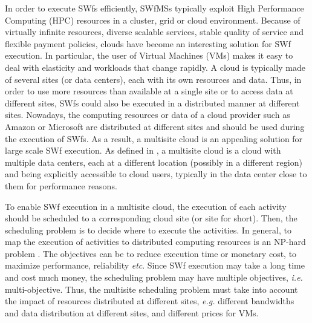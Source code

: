 In order to execute SWfs efficiently, SWfMSs typically exploit High Performance Computing (HPC) resources in a cluster, grid or cloud environment. 
Because of virtually infinite resources, diverse scalable services, stable quality of service and flexible payment policies, clouds have become an interesting solution for SWf execution. In particular, the user of Virtual Machines (VMs) makes it easy to deal with elasticity and workloads that change rapidly.
A cloud is typically made of several sites (or data centers), each
with its own resources and data. Thus, in order to use more resources than
available at a single site or to access data at different sites, SWfs could also be executed in a distributed manner at different sites.
Nowadays, the computing resources or data of a cloud provider such as Amazon or Microsoft are distributed at different sites and should be used during the execution of SWfs. 
As a result, a multisite cloud is an appealing solution for large scale SWf execution. As defined in \cite{Liu2014a}, a multisite cloud is a cloud with multiple data centers, each at a different location (possibly in a different region) and being explicitly accessible to cloud users, typically in the data center close to them for performance reasons. 

To enable SWf execution in a multisite cloud, the execution of each activity should be scheduled to a corresponding cloud site (or site for short). Then, the scheduling problem is to decide where to execute the activities. In general, to map the execution of activities to distributed computing resources is an NP-hard problem \cite{Yu2005}. The objectives can be to reduce execution time or monetary cost, to maximize performance, reliability \textit{etc}. Since SWf execution may take a long time and cost much money, the scheduling problem may have multiple objectives, \textit{i.e.} multi-objective. Thus, the multisite scheduling problem must take into account the impact of resources distributed at different sites, \textit{e.g.} different bandwidths and data distribution at different sites, and different prices for VMs. 

